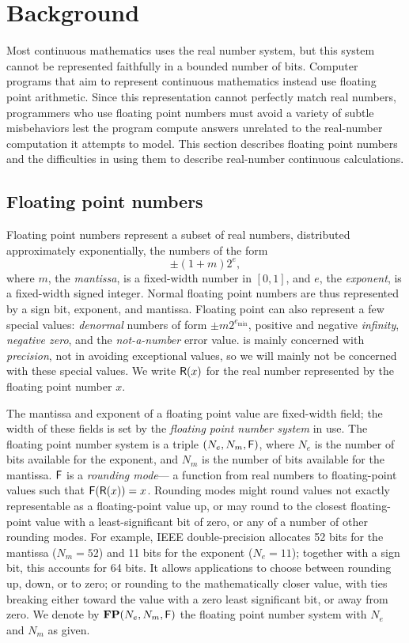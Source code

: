 \documentclass[paper.tex]{subfiles}
\begin{document}
\section{Background}

Most continuous mathematics uses the real number system,
  but this system cannot be represented faithfully
  in a bounded number of bits.
Computer programs that aim to represent continuous mathematics
  instead use floating point arithmetic.
Since this representation cannot perfectly match real numbers,
  programmers who use floating point numbers
  must avoid a variety of subtle misbehaviors
  lest the program compute answers
  unrelated to the real-number computation it attempts to model.
This section describes floating point numbers
  and the difficulties in using them to describe
  real-number continuous calculations.

\subsection{Floating point numbers}

Floating point numbers represent a subset of real numbers,
  distributed approximately exponentially, the numbers of the form
\[ \pm (1 + m) 2^e, \]
  where $m$, the \emph{mantissa}, is a fixed-width number in $[0, 1]$,
  and $e$, the \emph{exponent}, is a fixed-width signed integer.
Normal floating point numbers are thus represented by
  a sign bit, exponent, and mantissa.
Floating point can also represent a few special values:
  \emph{denormal} numbers of form $\pm m 2^{e_{\text{min}}}$,
  positive and negative \emph{infinity}, \emph{negative zero},
  and the \emph{not-a-number} error value.
\casio is mainly concerned with \emph{precision},
  not in avoiding exceptional values,
  so we will mainly not be concerned with these special values.
We write $\mathsf{R}(x)$ for the real number represented
  by the floating point number $x$.

The mantissa and exponent of a floating point value
  are fixed-width field; the width of these fields
  is set by the \emph{floating point number system} in use.
The floating point number system is a triple $(N_e, N_m, \mathsf{F})$,
  where $N_e$ is the number of bits available for the exponent,
  and $N_m$ is the number of bits available for the mantissa.
$\mathsf{F}$ is a \emph{rounding mode}---%
  a function from real numbers to floating-point values
  such that $\mathsf{F}(\mathsf{R}(x)) = x$.
Rounding modes might round values
  not exactly representable as a floating-point value
  up, or may round to the closest floating-point value
  with a least-significant bit of zero,
  or any of a number of other rounding modes.
For example, IEEE double-precision allocates
  52 bits for the mantissa ($N_m = 52$)
  and 11 bits for the exponent ($N_e = 11$);
  together with a sign bit, this accounts for 64 bits.
It allows applications to choose between rounding up, down, or to zero;
  or rounding to the mathematically closer value, with ties breaking
  either toward the value with a zero least significant bit,
  or away from zero.
We denote by $\mathbf{FP}(N_e, N_m, \mathsf{F})$
  the floating point number system with $N_e$ and $N_m$ as given.
\end{document}
